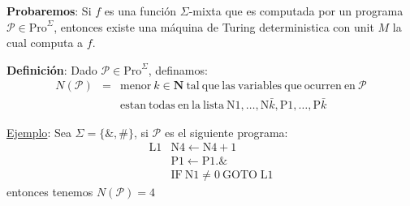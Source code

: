 \begin{frame}
	\textbf{Probaremos}: Si $f$ es una función $\Sigma$-mixta que es computada por un programa $\mathcal{P} \in
	\mathrm{Pro}^{\Sigma}$, entonces existe una máquina de Turing deterministica con unit $M$ la cual computa a $f$.

	\vspace{3mm}
	\textbf{Definición}: Dado $\mathcal{P} \in \mathrm{Pro}^{\Sigma}$, definamos:
	\begin{eqnarray*}
		N(\mathcal{P}) &=& \mathrm{menor}\ k \in \mathbf{N}\ \mathrm{tal\ que\ las\ variables\ que\ ocurren\ en\ }
			\mathcal{P} \\
		&& \mathrm{esta} \text{n} \mathrm{\ todas\ en\ la\ lista\ N}1, \dotsc, \mathrm{N}\bar{k}, \mathrm{P}1, \dotsc,
			\mathrm{P}\bar{k}
	\end{eqnarray*}

	\PN \underline{Ejemplo}: Sea $\Sigma = \{\&,\#\}$, si $\mathcal{P}$ es el siguiente programa:
	\begin{equation*}
		\begin{array}{ll}
			\mathrm{L}1 & \mathrm{N}4\leftarrow \mathrm{N}4+1 \\
			& \mathrm{P}1\leftarrow \mathrm{P}1.\& \\
			& \mathrm{IF\ N}1\neq 0\ \mathrm{GOTO}\;\mathrm{L}1
		\end{array}
	\end{equation*}
	entonces tenemos $N(\mathcal{P})=4$
\end{frame}
